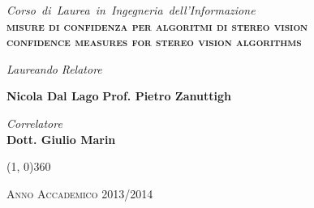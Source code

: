 \documentclass[12pt]{report}
\newcommand{\ThesisTitle}{misure di confidenza per algoritmi di \newline stereo vision}
\newcommand{\nullpage}{\newpage\null\thispagestyle{empty}}  %
\begin{document}
\begin{titlepage}
\begin{center}
			\vspace{1.5cm}
			\emph{\Large{Corso~di~Laurea~in~Ingegneria~dell'Informazione}} \\
			
			\vspace{1.5cm}
			\scshape{\Large{\bfseries{\ThesisTitle}}} \\
			\vspace{0.2cm} \linespread{1} \scshape{\large{\bfseries{confidence measures for stereo vision algorithms}}}
		\end{center}

		\vfill
		\begin{normalsize}
			\begin{flushleft}
  				\hspace{83pt} \textit{Laureando} \hspace{142pt} \textit{Relatore}\\
  				\vspace{5pt}
  
  				\hspace{62pt} \large{\textbf{Nicola Dal Lago}} \hspace{71pt} \large{\textbf{Prof. Pietro Zanuttigh}}\\
			\end{flushleft}
		\end{normalsize}
		
		\begin{normalsize}
			\begin{flushleft}
		  				\hspace{276pt} \textit{Correlatore}\\
		  
		  				\vspace{5pt}
		  				\hspace{249pt} \large{\textbf{Dott. Giulio Marin}}\\
			\end{flushleft}
		\end{normalsize}
		\vfill
		
		\begin{center}
			\hspace{-0.2cm}
			\line(1, 0){360}

			\textsc{Anno Accademico 2013/2014}
		\end{center}
 	\end{titlepage}


	\nullpage                      %
\end{document}
